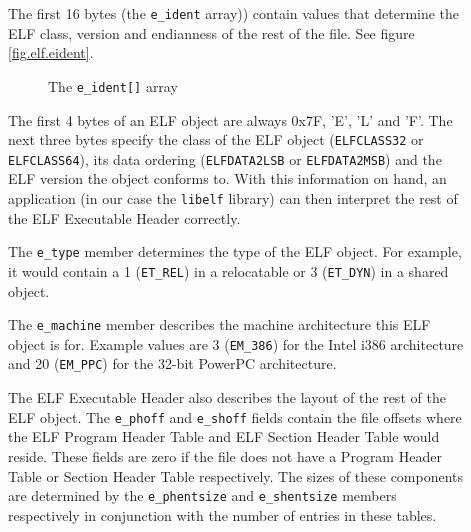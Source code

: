 \documentclass[a4paper]{book}
\makeatletter
\newcommand{\constant}[1]{\texttt{#1}}
\newcommand{\library}[1]{\texttt{#1}}
\newcommand{\parameter}[1]{\texttt{#1}}
\newcommand{\reg}{\textregistered\xspace}
\newcommand{\trade}{\texttrademark\xspace}
\newenvironment{callout}[2][blue]{%
  \begingroup\newcommand{\@cocolor}{#1}%
  \newcommand{\@cogroup}[1]{#2}}{\endgroup}
\newcommand{\@co}[1]{\framebox{\textbf{\color{\@cocolor}#1}}}
\newcommand{\coref}[1]{%
  \hypertarget{\@cogroup.#1.cr}{%
    \hyperlink{\@cogroup.#1.co}{\@co{#1}}}}
\makeatother
\begin{document}
\begin{callout}{ehdr}
  \begin{description}
  \item[\coref{1}] The first 16 bytes (the \parameter{e\_ident}
    array)) contain values that determine the ELF class, version and
    endianness of the rest of the file.  See figure
    \vref{fig.elf.eident}.

    \begin{figure}[H]
      \caption{The \parameter{e\_ident[]} array}\label{fig.elf.eident}
      \begin{center}
      \end{center}
    \end{figure}

    The first 4 bytes of an ELF object are always 0x7F, 'E', 'L' and
    'F'.  The next three bytes specify the class of the ELF object
    (\constant{ELFCLASS32} or \constant{ELFCLASS64}), its data
    ordering (\constant{ELFDATA2LSB} or \constant{ELFDATA2MSB}) and
    the ELF version the object conforms to.  With this information on
    hand, an application (in our case the \library{libelf} library)
    can then interpret the rest of the ELF Executable Header
    correctly.

  \item[\coref{2}] The \parameter{e\_type} member determines the type
    of the ELF object.  For example, it would contain a 1
    (\constant{ET\_REL}) in a relocatable or 3 (\constant{ET\_DYN}) in
    a shared object.

  \item[\coref{3}] The \parameter{e\_machine} member describes the
    machine architecture this ELF object is for.  Example values are 3
    (\constant{EM\_386}) for the Intel\reg i386\trade architecture and
    20 (\constant{EM\_PPC}) for the 32-bit PowerPC\trade architecture.

  \item[\coref{4} \coref{5}] The ELF Executable Header also describes
    the layout of the rest of the ELF object.  The
    \parameter{e\_phoff} and \parameter{e\_shoff} fields contain the
    file offsets where the ELF Program Header Table and ELF Section
    Header Table would reside.  These fields are zero if the file does
    not have a Program Header Table or Section Header Table
    respectively.  The sizes of these components are determined by the
    \parameter{e\_phentsize} and \parameter{e\_shentsize} members
    respectively in conjunction with the number of entries in these
    tables.


\end{description}
\end{callout}
\end{document}
